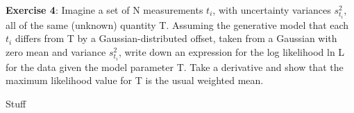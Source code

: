 \documentclass[11pt]{article}
\begin{document}
\noindent

{\bf Exercise 4}: Imagine a set of N measurements $t_i$, with uncertainty variances $s^2_{t_i}$, all of the same (unknown) quantity T. Assuming the generative model that each $t_i$ differs from T by a Gaussian-distributed offset, taken from a Gaussian with zero mean and variance $s^2_{t_i}$, write down an expression for the log likelihood ln L for the data given the model parameter T. Take a derivative and show that the maximum likelihood value for T is the usual weighted mean.

Stuff
\end{document}
